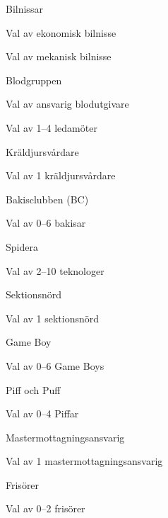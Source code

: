 \documentclass{sektionsmote}
\begin{document}
\begin{ootd}
\begin{ootd}
    \item Bilnissar
    \begin{ootd}
        \item Val av ekonomisk bilnisse
        \item Val av mekanisk bilnisse
    \end{ootd}
    \item Blodgruppen
    \begin{ootd}
        \item Val av ansvarig blodutgivare
        \item Val av 1--4 ledamöter
    \end{ootd}
    \item Kräldjursvårdare
    \begin{ootd}
        \item Val av 1 kräldjursvårdare
    \end{ootd}
    \item Bakisclubben (BC)
    \begin{ootd}
        \item Val av 0--6 bakisar
    \end{ootd}
    \item Spidera
    \begin{ootd}
        \item Val av 2--10 teknologer
    \end{ootd}
    \item Sektionsnörd
    \begin{ootd}
        \item Val av 1 sektionsnörd
    \end{ootd}
    \item Game Boy
    \begin{ootd}
        \item Val av 0--6 Game Boys
    \end{ootd}
    \item Piff och Puff
    \begin{ootd}
        \item Val av 0--4 Piffar
    \end{ootd}
    \item Mastermottagningsansvarig
    \begin{ootd}
        \item Val av 1 mastermottagningsansvarig
    \end{ootd}
    \item Frisörer
    \begin{ootd}
        \item Val av 0--2 frisörer
    \end{ootd}
\end{ootd}


\end{ootd}
\end{document}
